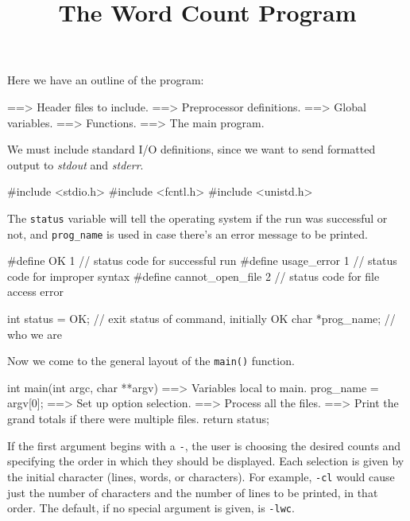 \documentclass[11pt,a4paper]{article}
\title{The Word Count Program}
\begin{document}
\maketitle

Here we have an outline of the program:

\begin{code}[language=c,]
==> Header files to include.
==> Preprocessor definitions.
==> Global variables.
==> Functions.
==> The main program.
\end{code}

We must include standard I/O definitions, since we want to send formatted output to \emph{stdout}
and \emph{stderr}.

\begin{code}[language=c,name={Header files to include}]
#include <stdio.h>
#include <fcntl.h>
#include <unistd.h>
\end{code}

The \texttt{status} variable will tell the operating system if the run was successful or not, and
\texttt{prog\_name} is used in case there's an error message to be printed.

\begin{code}[language=c,name={Preprocessor definitions}]
#define OK 1                // status code for successful run
#define usage_error 1       // status code for improper syntax
#define cannot_open_file 2  // status code for file access error
\end{code}

\begin{code}[language=c,name={Global variables}]
int status = OK;  // exit status of command, initially OK
char *prog_name;  // who we are
\end{code}

Now we come to the general layout of the \texttt{main()} function.

\begin{code}[language=c,name={The main program}]
int main(int argc, char **argv)
{
    ==> Variables local to main.
    prog_name = argv[0];
    ==> Set up option selection.
    ==> Process all the files.
    ==> Print the grand totals if there were multiple files.
    return status;
}
\end{code}

If the first argument begins with a \texttt{-}, the user is choosing the desired counts and
specifying the order in which they should be displayed. Each selection is given by the initial
character  (lines, words, or characters). For example, \texttt{-cl} would cause just the number of
characters and the number of lines to be printed, in that order. The default, if no special argument
is given, is \texttt{-lwc}.
\end{document}
